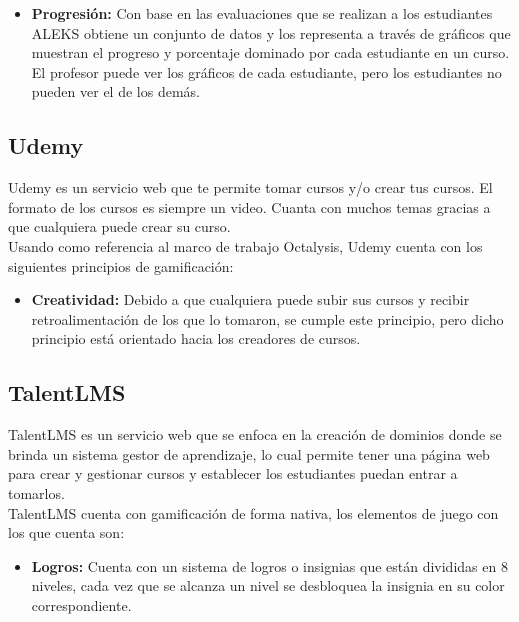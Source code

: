 \begin{multicols*}{2}
\begin{itemize}
        \item {\bf Progresión:} Con base en las evaluaciones que se realizan a los
            estudiantes ALEKS obtiene un conjunto de datos y los representa a través
            de gráficos que muestran el progreso y porcentaje dominado por cada
            estudiante en un curso. El profesor puede ver los gráficos de cada estudiante,
            pero los estudiantes no pueden ver el de los demás.
    \end{itemize}


\vfill\null
\columnbreak
\subsection{Udemy}

 Udemy \cite{PagUdemy} es un servicio web que te permite tomar cursos y/o crear tus
 cursos. El formato de los cursos es siempre un video. Cuanta con muchos temas gracias
 a que cualquiera puede crear su curso.\\

    \noindent Usando como referencia al marco de trabajo Octalysis,
    Udemy cuenta con los siguientes principios de gamificación:

    \begin{itemize}
        \item {\bf Creatividad:} Debido a que cualquiera puede subir
        sus cursos y recibir retroalimentación de los que lo tomaron,
        se cumple este principio, pero dicho principio está orientado
        hacia los creadores de cursos.
    \end{itemize}

\subsection{TalentLMS}

 TalentLMS \cite{PagTalentLMS} es un servicio web que se enfoca en la creación de dominios
 donde se brinda un sistema gestor de aprendizaje, lo cual permite tener una página web para
 crear y gestionar cursos y establecer los estudiantes puedan entrar a tomarlos.\\

    \noindent TalentLMS cuenta con gamificación de forma nativa,
    los elementos de juego con los que cuenta son:

    \begin{itemize}

        \item {\bf Logros:} Cuenta con un sistema de logros o insignias que
            están divididas en 8 niveles, cada vez que se alcanza un nivel se
            desbloquea la insignia en su color correspondiente.


\end{itemize}
\end{multicols*}
